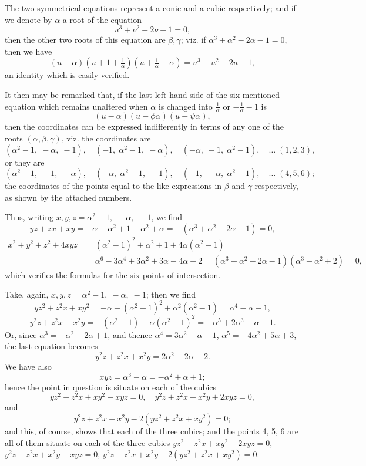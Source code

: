\documentclass[11pt,a4paper]{book}
\begin{document}
\begin{solution}
The two symmetrical equations represent a conic and a cubic respectively; and if we denote by $\alpha$ a root of the equation
\[
u^3+\nu^2-2\nu-1=0,
\]
then the other two roots of this equation are $\beta, \gamma$; viz. if $\alpha^3+\alpha^2-2\alpha-1=0$, then we have
\[
(u-\alpha)(u+1+\tfrac{1}{\alpha})(u+\tfrac{1}{\alpha}-\alpha) = u^3+u^2-2u-1,
\]
an identity which is easily verified.

It then may be remarked that, if the last left-hand side of the six mentioned equation which remains unaltered when $\alpha$ is changed into $\frac{1}{\alpha}$ or $-\frac{1}{\alpha}-1$ is
\[
(u-\alpha)(u-\phi\alpha)(u-\psi\alpha),
\]
then the coordinates can be expressed indifferently in terms of any one of the roots $(\alpha,\beta,\gamma)$, viz. the coordinates are
\[
(\alpha^2-1, \; -\alpha, \; -1), \quad (-1, \; \alpha^2-1, \; -\alpha), \quad (-\alpha, \; -1, \; \alpha^2-1), \quad \ldots\; (1,2,3),
\]
or they are
\[
(\alpha^2-1, \; -1, \; -\alpha), \quad (-\alpha, \; \alpha^2-1, \; -1), \quad (-1, \; -\alpha, \; \alpha^2-1), \quad \ldots\; (4,5,6);
\]
the coordinates of the points equal to the like expressions in $\beta$ and $\gamma$ respectively, as shown by the attached numbers.

Thus, writing $x,y,z = \alpha^2-1, \; -\alpha, \; -1$, we find
\[
yz+zx+xy = -\alpha - \alpha^2 + 1 - \alpha^2 + \alpha = -(\alpha^3+\alpha^2-2\alpha-1) = 0,
\]
\[
\begin{aligned}
x^2+y^2+z^2+4xyz &= (\alpha^2-1)^2 + \alpha^2 + 1 + 4\alpha(\alpha^2-1) \\
&= \alpha^6 - 3\alpha^4 + 3\alpha^2 + 3\alpha - 4\alpha - 2 = (\alpha^3+\alpha^2-2\alpha-1)(\alpha^3-\alpha^2+2) = 0,
\end{aligned}
\]
which verifies the formulas for the six points of intersection.

Take, again, $x,y,z = \alpha^2-1, \; -\alpha, \; -1$; then we find
\[
yz^2+z^2x+xy^2 = -\alpha - (\alpha^2-1)^2 + \alpha^2(\alpha^2-1) = \alpha^4 - \alpha - 1,
\]
\[
y^2z+z^2x+x^2y = +(\alpha^2-1) - \alpha(\alpha^2-1)^2 = -\alpha^5 + 2\alpha^3 - \alpha - 1.
\]
Or, since $\alpha^3 = -\alpha^2+2\alpha+1$, and thence $\alpha^4 = 3\alpha^2-\alpha-1$, $\alpha^5 = -4\alpha^2+5\alpha+3$, the last equation becomes
\[
y^2z+z^2x+x^2y = 2\alpha^2 - 2\alpha - 2.
\]
We have also
\[
xyz = \alpha^3 - \alpha = -\alpha^2 + \alpha + 1;
\]
hence the point in question is situate on each of the cubics
\[
yz^2+z^2x+xy^2+xyz=0, \quad y^2z+z^2x+x^2y+2xyz=0,
\]
and
\[
y^2z+z^2x+x^2y-2(yz^2+z^2x+xy^2)=0;
\]
and this, of course, shows that each of the three cubics; and the points 4, 5, 6 are all of them situate on each of the three cubics $yz^2+z^2x+xy^2+2xyz=0$, $y^2z+z^2x+x^2y+xyz=0$, $y^2z+z^2x+x^2y-2(yz^2+z^2x+xy^2)=0$.


\end{solution}
\end{document}
